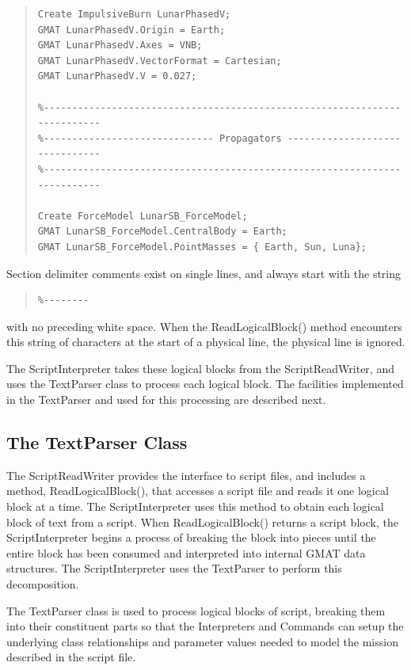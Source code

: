 \begin{quote}
\begin{verbatim}
Create ImpulsiveBurn LunarPhasedV;
GMAT LunarPhasedV.Origin = Earth;
GMAT LunarPhasedV.Axes = VNB;
GMAT LunarPhasedV.VectorFormat = Cartesian;
GMAT LunarPhasedV.V = 0.027;

%--------------------------------------------------------------------------
%------------------------------ Propagators -------------------------------
%--------------------------------------------------------------------------

Create ForceModel LunarSB_ForceModel;
GMAT LunarSB_ForceModel.CentralBody = Earth;
GMAT LunarSB_ForceModel.PointMasses = { Earth, Sun, Luna};
\end{verbatim}
\end{quote}

\noindent Section delimiter comments exist on single lines, and always start with the string
\begin{quote}
\begin{verbatim}
%--------
\end{verbatim}
\end{quote}

\noindent with no preceding white space.   When the ReadLogicalBlock() method encounters this string
of characters at the start of a physical line, the physical line is ignored.

The ScriptInterpreter takes these logical blocks from the ScriptReadWriter, and uses the TextParser
class to process each logical block.  The facilities implemented in the TextParser and used for this
processing are described next.

\subsection{\label{section:TextParser}The TextParser Class}

The ScriptReadWriter provides the interface to script files, and includes a method,
ReadLogicalBlock(), that accesses a script file and reads it one logical block at a time.  The
ScriptInterpreter uses this method to obtain each logical block of text from a script.  When
ReadLogicalBlock() returns a script block, the ScriptInterpreter begins a process of breaking the
block into pieces until the entire block has been consumed and interpreted into internal GMAT data
structures.  The ScriptInterpreter uses the TextParser to perform this decomposition.

The TextParser class is used to process logical blocks of script, breaking them into their
constituent parts so that the Interpreters and Commands can setup the underlying class relationships
and parameter values needed to model the mission described in the script file.

